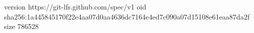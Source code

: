 version https://git-lfs.github.com/spec/v1
oid sha256:1a445845170f22e4aa07d0aa4636dc7164e4ed7c090a07d15108e61eaa87da2f
size 786528
